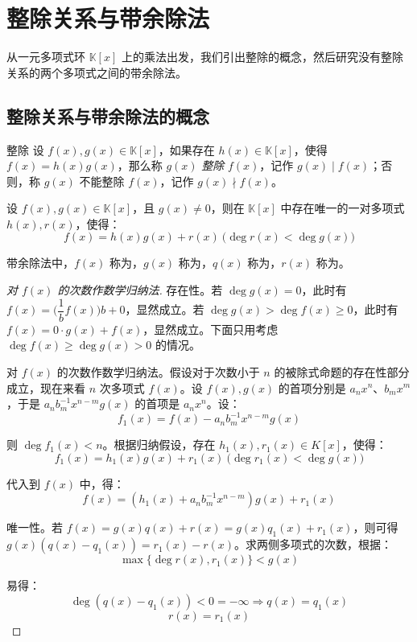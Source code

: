 
\section{整除关系与带余除法}

从一元多项式环 $\mathbb K[x]$ 上的乘法出发，我们引出整除的概念，然后研究没有整除关系的两个多项式之间的带余除法。

\subsection{整除关系与带余除法的概念}

\begin{definition}{整除}
	设 $f(x), g(x) \in \mathbb K[x]$，如果存在 $h(x) \in \mathbb K[x]$，使得 $f(x) = h(x) g(x)$，那么称 $g(x)$ \emph{整除} $f(x)$，记作 $g(x) \mid f(x)$；否则，称 $g(x)$ 不能整除 $f(x)$，记作 $g(x) \nmid f(x)$。
\end{definition}

\begin{proposition}[带余除法]
	设 $f(x), g(x) \in \mathbb K[x]$，且 $g(x) \ne 0$，则在 $\mathbb K[x]$ 中存在唯一的一对多项式 $h(x), r(x)$，使得：
	$$
	f(x) = h(x) g(x) + r(x) \pod{\deg r(x) < \deg g(x)}
	$$

	带余除法中，$f(x)$ 称为\emph{}，$g(x)$ 称为\emph{}，$q(x)$ 称为\emph{}，$r(x)$ 称为\emph{}。
\end{proposition}

\begin{proof}[对 $f(x)$ 的次数作数学归纳法]
	存在性。若 $\deg g(x) = 0$，此时有 $f(x) = \biggl( \dfrac{1}{b} f(x) \biggr) b + 0$，显然成立。若 $\deg g(x) > \deg f(x) \ge 0$，此时有 $f(x) = 0 \cdot g(x) + f(x)$，显然成立。下面只用考虑 $\deg f(x) \ge \deg g(x) > 0$ 的情况。

	对 $f(x)$ 的次数作数学归纳法。假设对于次数小于 $n$ 的被除式命题的存在性部分成立，现在来看 $n$ 次多项式 $f(x)$。设 $f(x), g(x)$ 的首项分别是 $a_n x^n$、$b_m x^m$，于是 $a_n b_m^{-1} x^{n - m} g(x)$ 的首项是 $a_n x^n$。设：
	$$
	f_1(x) = f(x) - a_n b_m^{-1} x^{n - m} g(x)
	$$

	则 $\deg f_1(x) < n$。根据归纳假设，存在 $h_1(x), r_1(x) \in K[x]$，使得：
	$$
	f_1(x) = h_1(x) g(x) + r_1(x) \pod{\deg r_1(x) < \deg g(x)}
	$$

	代入到 $f(x)$ 中，得：
	$$
	f(x) = (h_1(x) + a_n b_m^{-1} x^{n - m}) g(x) + r_1(x)
	$$

	唯一性。若 $f(x) = g(x) q(x) + r(x) = g(x) q_1(x) + r_1(x)$，则可得 $g(x) (q(x) - q_1(x)) = r_1(x) - r(x)$。求两侧多项式的次数，根据：
	$$
	\max \{ \deg r(x), r_1(x) \} < g(x)
	$$

	易得：
	$$
	\deg(q(x) - q_1(x)) < 0 = -\infty \Longrightarrow q(x) = q_1(x)
	$$$$
	r(x) = r_1(x)
	$$
\end{proof}

